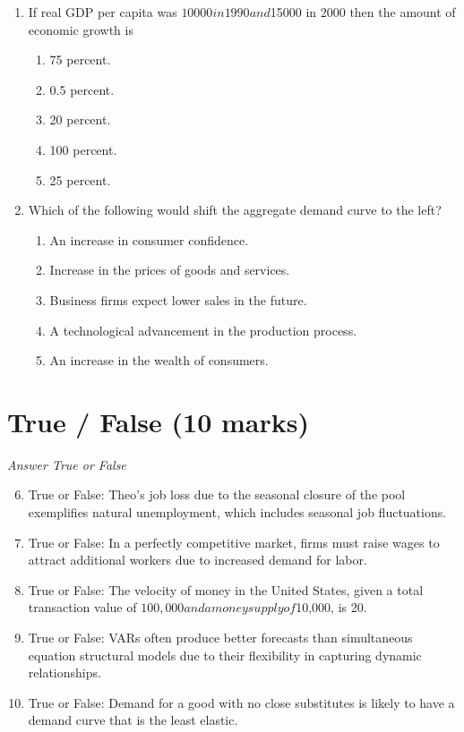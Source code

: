 \documentclass[12pt]{article}
\begin{document}
\begin{enumerate}[label=\arabic*.]
\item If real GDP per capita was $10000 in 1990 and $15000 in 2000 then the amount of economic growth is
\begin{enumerate}[label=(\alph*)]
    \item 75 percent.
    \item 0.5 percent.
    \item 20 percent.
    \item 100 percent.
    \item 25 percent.
\end{enumerate}
\item Which of the following would shift the aggregate demand curve to the left?
\begin{enumerate}[label=(\alph*)]
    \item An increase in consumer confidence.
    \item Increase in the prices of goods and services.
    \item Business firms expect lower sales in the future.
    \item A technological advancement in the production process.
    \item An increase in the wealth of consumers.
\end{enumerate}
\end{enumerate}

\section*{True / False (10 marks)}
\textit{Answer True or False}
\begin{enumerate}[label=\arabic*.]
\setcounter{enumi}{5}
\item True or False: Theo's job loss due to the seasonal closure of the pool exemplifies natural unemployment, which includes seasonal job fluctuations.
\item True or False: In a perfectly competitive market, firms must raise wages to attract additional workers due to increased demand for labor.
\item True or False: The velocity of money in the United States, given a total transaction value of $100,000 and a money supply of $10,000, is 20.
\item True or False: VARs often produce better forecasts than simultaneous equation structural models due to their flexibility in capturing dynamic relationships.
\item True or False: Demand for a good with no close substitutes is likely to have a demand curve that is the least elastic.
\end{enumerate}
\end{document}

